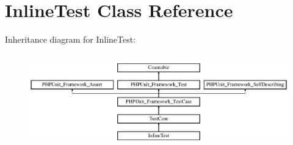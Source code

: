 \hypertarget{class_symfony_1_1_component_1_1_yaml_1_1_tests_1_1_inline_test}{}\section{Inline\+Test Class Reference}
\label{class_symfony_1_1_component_1_1_yaml_1_1_tests_1_1_inline_test}
Inheritance diagram for Inline\+Test\+:\begin{figure}[H]
\begin{center}
\leavevmode
\includegraphics[height=4.129793cm]{class_symfony_1_1_component_1_1_yaml_1_1_tests_1_1_inline_test}
\end{center}
\end{figure}
